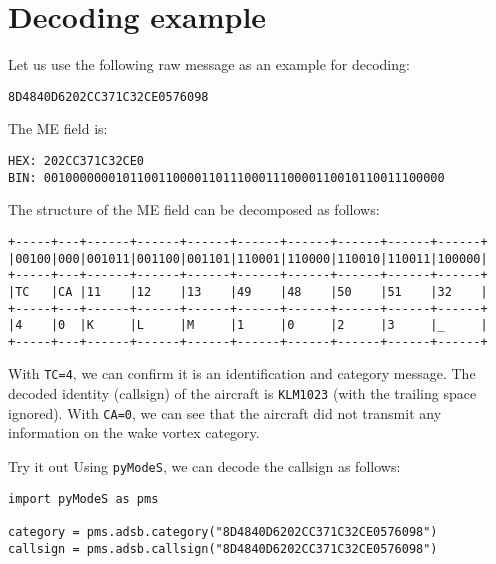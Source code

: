 \section{Decoding example}

Let us use the following raw message as an example for decoding:

\begin{verbatim}
8D4840D6202CC371C32CE0576098
\end{verbatim}

The ME field is:

\begin{verbatim}
HEX: 202CC371C32CE0
BIN: 00100000001011001100001101110001110000110010110011100000
\end{verbatim}

The structure of the ME field can be decomposed as follows:

\begin{verbatim}
+-----+---+------+------+------+------+------+------+------+------+
|00100|000|001011|001100|001101|110001|110000|110010|110011|100000|
+-----+---+------+------+------+------+------+------+------+------+
|TC   |CA |11    |12    |13    |49    |48    |50    |51    |32    |
+-----+---+------+------+------+------+------+------+------+------+
|4    |0  |K     |L     |M     |1     |0     |2     |3     |_     |
+-----+---+------+------+------+------+------+------+------+------+
\end{verbatim}

With \texttt{TC=4}, we can confirm it is an identification and category message. The decoded identity (callsign) of the aircraft is \texttt{KLM1023} (with the trailing space ignored). With \texttt{CA=0}, we can see that the aircraft did not transmit any information on the wake vortex category.

\begin{notebox}{Try it out}
Using \texttt{pyModeS}, we can decode the callsign as follows:

\begin{verbatim}
import pyModeS as pms

category = pms.adsb.category("8D4840D6202CC371C32CE0576098")
callsign = pms.adsb.callsign("8D4840D6202CC371C32CE0576098")
\end{verbatim}

\end{notebox}
 
  